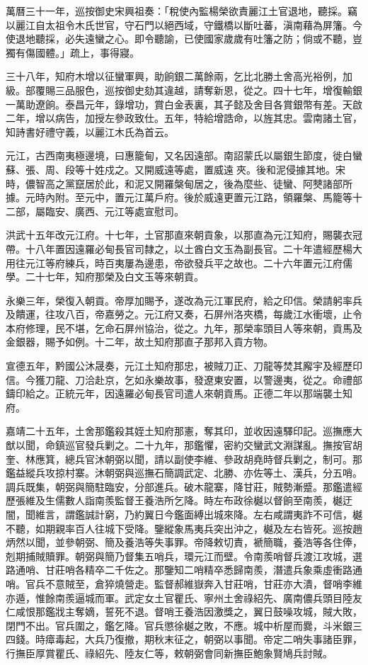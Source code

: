 \begin{pinyinscope}
萬曆三十一年，巡按御史宋興祖奏：「稅使內監楊榮欲責麗江土官退地，聽採。竊以麗江自太祖令木氏世官，守石門以絕西域，守鐵橋以斷吐蕃，滇南藉為屏籓。今使退地聽採，必失遠蠻之心。即令聽諭，已使國家歲歲有吐籓之防；倘或不聽，豈獨有傷國體。」疏上，事得寢。

三十八年，知府木增以征蠻軍興，助餉銀二萬餘兩，乞比北勝土舍高光裕例，加級。部覆賜三品服色，巡按御史劾其違越，請奪新恩，從之。四十七年，增復輸銀一萬助遼餉。泰昌元年，錄增功，賞白金表裏，其子懿及舍目各賞銀幣有差。天啟二年，增以病告，加授左參政致仕。五年，特給增誥命，以旌其忠。雲南諸土官，知詩書好禮守義，以麗江木氏為首云。

元江，古西南夷極邊境，曰惠籠甸，又名因遠部。南詔蒙氏以屬銀生節度，徙白蠻蘇、張、周、段等十姓戍之。又開威遠等處，置威遠夾。後和泥侵據其地。宋時，儂智高之黨竄居於此，和泥又開羅槃甸居之，後為麼些、徒蠻、阿僰諸部所據。元時內附。至元中，置元江萬戶府。後於威遠更置元江路，領羅槃、馬籠等十二部，屬臨安、廣西、元江等處宣慰司。

洪武十五年改元江府。十七年，土官那直來朝貢象，以那直為元江知府，賜襲衣冠帶。十八年置因遠羅必甸長官司隸之，以土酋白文玉為副長官。二十年遣經歷楊大用往元江等府練兵，時百夷屢為邊患，帝欲發兵平之故也。二十六年置元江府儒學。二十七年，知府那榮及白文玉等來朝貢。

永樂三年，榮復入朝貢。帝厚加賜予，遂改為元江軍民府，給之印信。榮請躬率兵及饋運，往攻八百，帝嘉勞之。元江府又奏，石屏州洛夾橋，每歲江水衝壞，止令本府修理，民不堪，乞命石屏州協治，從之。九年，那榮率頭目人等來朝，貢馬及金銀器，賜予如例。十二年，故土知府那直子那邦入貢方物。

宣德五年，黔國公沐晟奏，元江土知府那忠，被賊刀正、刀龍等焚其廨宇及經歷印信。今獲刀龍、刀洽赴京，乞如永樂故事，發遼東安置，以警邊夷，從之。命禮部鑄印給之。正統元年，因遠羅必甸長官司遣人來朝貢馬。正德二年以那端襲土知府。

嘉靖二十五年，土舍那鑑殺其姪土知府那憲，奪其印，並收因遠驛印記。巡撫應大猷以聞，命鎮巡官發兵剿之。二十九年，那鑑懼，密約交蠻武文淵謀亂。撫按官胡奎、林應箕，總兵官沐朝弼以聞，請以副使李維、參政胡堯時督兵剿之，制可。那鑑益縱兵攻掠村寨。沐朝弼與巡撫石簡調武定、北勝、亦佐等土、漢兵，分五哨。調兵既集，朝弼與簡駐臨安，分部進兵。破木龍寨，降甘莊，賊勢漸蹙。那鑑遣經歷張維及生儒數人詣南羨監督王養浩所乞降。時左布政徐樾以督餉至南羨，樾迂闇，聞維言，謂鑑誠計窮，乃約翼日今鑑面縛出城來降。左右咸謂夷詐不可信，樾不聽，如期親率百人往城下受降。鑒縱象馬夷兵突出沖之，樾及左右皆死。巡按趙炳然以聞，並參朝弼、簡及養浩等失事罪。帝降敕切責，褫簡職，養浩等各住俸，剋期捕賊贖罪。朝弼與簡乃督集五哨兵，環元江而壁。令南羨哨督兵渡江攻城，選路通哨、甘莊哨各精卒二千佐之。那鑒知二哨精卒悉歸南羨，潛遣兵象乘虛衝路通哨。官兵不意賊至，倉猝燒營走。監督郝維嶽奔入甘莊哨，甘莊亦大潰，督哨李維亦遁，惟餘南羨逼城而軍。武定女土官瞿氏、寧州土舍祿紹先、廣南儂兵頭目陸友仁咸恨那鑑戕主奪嫡，誓死不退。督哨王養浩因激獎之，翼日鼓噪攻城，賊大敗，閉門不出。官兵圍之，鑑乞降。官兵懲徐樾之敗，不應。城中析屋而爨，斗米銀三四錢。時瘴毒起，大兵乃復撤，期秋末征之，朝弼以事聞。帝定二哨失事諸臣罪，行撫臣厚賞瞿氏、祿紹先、陸友仁等，敕朝弼會同新撫臣鮑象賢鳩兵討賊。


\end{pinyinscope}
